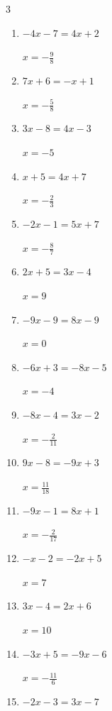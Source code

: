 \begin{multicols}{3}
\begin{enumerate}
  \item $-4x-7=4x+2$

        $\displaystyle x=-\frac{9}{8}$

  \item $7x+6=-x+1$

        $\displaystyle x=-\frac{5}{8}$

  \item $3x-8=4x-3$

        $\displaystyle x=-5$

  \item $x+5=4x+7$

        $\displaystyle x=-\frac{2}{3}$

  \item $-2x-1=5x+7$

        $\displaystyle x=-\frac{8}{7}$

  \item $2x+5=3x-4$

        $\displaystyle x=9$

  \item $-9x-9=8x-9$

        $\displaystyle x=0$

  \item $-6x+3=-8x-5$

        $\displaystyle x=-4$

\columnbreak %

\resetques

  \item $-8x-4=3x-2$

        $\displaystyle x=-\frac{2}{11}$

  \item $9x-8=-9x+3$

        $\displaystyle x=\frac{11}{18}$

  \item $-9x-1=8x+1$

        $\displaystyle x=-\frac{2}{17}$

  \item $-x-2=-2x+5$

        $\displaystyle x=7$

  \item $3x-4=2x+6$

        $\displaystyle x=10$

  \item $-3x+5=-9x-6$

        $\displaystyle x=-\frac{11}{6}$

  \item $-2x-3=3x-7$


\end{enumerate}
\end{multicols}
